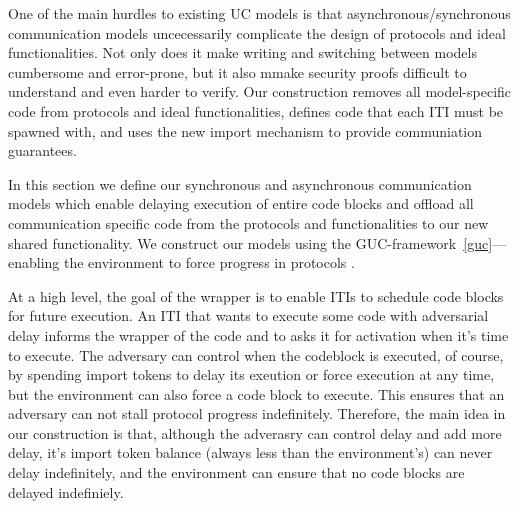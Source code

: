 
One of the main hurdles to existing UC models is that asynchronous/synchronous communication models uncecessarily complicate the design of protocols and ideal functionalities.
Not only does it make writing and switching between models cumbersome and error-prone, but it also mmake security proofs difficult to understand and even harder to verify.
Our construction removes all model-specific code from protocols and ideal functionalities, defines code that each ITI must be spawned with, and uses the new import mechanism to provide communiation guarantees.

In this section we define our synchronous and asynchronous communication models which enable delaying execution of entire code blocks and offload all communication specific code from the protocols and functionalities to our new shared functionality. 
We construct our models using the GUC-framework~\ref{guc}---enabling the environment to force progress in protocols .

At a high level, the goal of the wrapper is to enable ITIs to schedule code blocks for future execution.
An ITI that wants to execute some code with adversarial delay informs the wrapper of the code and to asks it for activation when it's time to execute.
The adversary can control when the codeblock is executed, of course, by spending import tokens to delay its exeution or force execution at any time, but the environment can also force a code block to execute.
This ensures that an adversary can not stall protocol progress indefinitely.
Therefore, the main idea in our construction is that, although the adverasry can control delay and add more delay, it's import token balance (always less than the environment's) can never delay indefinitely, and the environment can ensure that no code blocks are delayed indefiniely.

